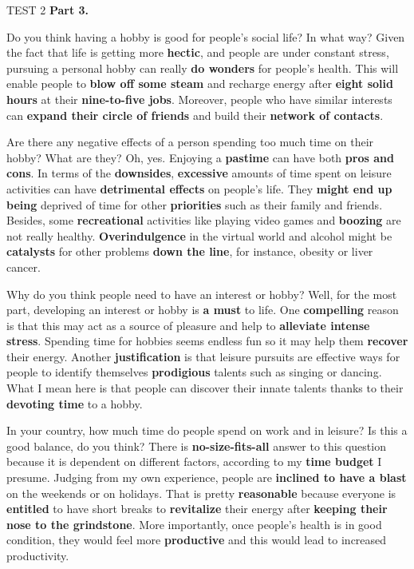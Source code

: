 \begin{glossarymc}[Cambridge 4]
\begin{test}{TEST 2}
    \noindent
    \textbf{Part 3.}
	\begin{qa}{Do you think having a hobby is good for people's social life? In what way?}
	Given the fact that life is getting more \textbf{hectic}, and people are under constant stress, pursuing a personal hobby can really \textbf{do wonders} for people's health. This will enable people to \textbf{blow off some steam} and recharge energy after \textbf{eight solid hours} at their \textbf{nine-to-five jobs}. Moreover, people who have similar interests can \textbf{expand their circle of friends} and build their \textbf{network of contacts}.
	\end{qa}

	\begin{qa}{Are there any negative effects of a person spending too much time on their hobby? What are they?}
	Oh, yes. Enjoying a \textbf{pastime} can have both \textbf{pros and cons}. In terms of the \textbf{downsides}, \textbf{excessive} amounts of time spent on leisure activities can have \textbf{detrimental effects} on people's life. They \textbf{might end up being} deprived of time for other \textbf{priorities} such as their family and friends. Besides, some \textbf{recreational} activities like playing video games and \textbf{boozing} are not really healthy. \textbf{Overindulgence} in the virtual world and alcohol might be \textbf{catalysts} for other problems \textbf{down the line}, for instance, obesity or liver cancer.
	\end{qa}

	\begin{qa}{Why do you think people need to have an interest or hobby?}
	Well, for the most part, developing an interest or hobby is \textbf{a must} to life. One \textbf{compelling} reason is that this may act as a source of pleasure and help to \textbf{alleviate intense stress}. Spending time for hobbies seems endless fun so it may help them \textbf{recover} their energy. Another \textbf{justification} is that leisure pursuits are effective ways for people to identify themselves \textbf{prodigious} talents such as singing or dancing. What I mean here is that people can discover their innate talents thanks to their \textbf{devoting time} to a hobby.
	\end{qa}

	\begin{qa}{In your country, how much time do people spend on work and in leisure? Is this a good balance, do you think?}
	There is \textbf{no-size-fits-all} answer to this question because it is dependent on different factors, according to my \textbf{time budget} I presume. Judging from my own experience, people are \textbf{inclined to have a blast} on the weekends or on holidays. That is pretty \textbf{reasonable} because everyone is \textbf{entitled} to have short breaks to \textbf{revitalize} their energy after \textbf{keeping their nose to the grindstone}. More importantly, once people's health is in good condition, they would feel more \textbf{productive} and this would lead to increased productivity.
	\end{qa}


\end{test}
\end{glossarymc}
